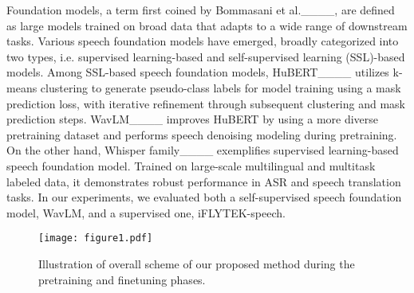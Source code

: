 Foundation models, a term first coined by Bommasani et al.____, are defined as large models trained on broad data that adapts to a wide range of downstream tasks. Various speech foundation models have emerged, broadly categorized into two types, i.e. supervised learning-based and self-supervised learning (SSL)-based models.
Among SSL-based speech foundation models, 
HuBERT____  utilizes k-means clustering to generate pseudo-class labels for model training using a mask prediction loss,
with iterative refinement through subsequent clustering and mask prediction steps.
WavLM____ improves HuBERT by using a more diverse pretraining dataset and performs speech denoising modeling during pretraining.
On the other hand, Whisper family____ exemplifies  supervised learning-based speech foundation model. Trained on large-scale multilingual and multitask labeled data, it demonstrates robust performance in ASR and speech translation tasks. 
In our experiments, we evaluated both a self-supervised speech foundation model, WavLM, and a supervised one, iFLYTEK-speech.

\begin{figure}
    \centering
    \texttt{[image: figure1.pdf]}
    \caption{Illustration of  overall scheme of our proposed method during the pretraining and finetuning phases.}
    \label{fig:figure1}
\end{figure}